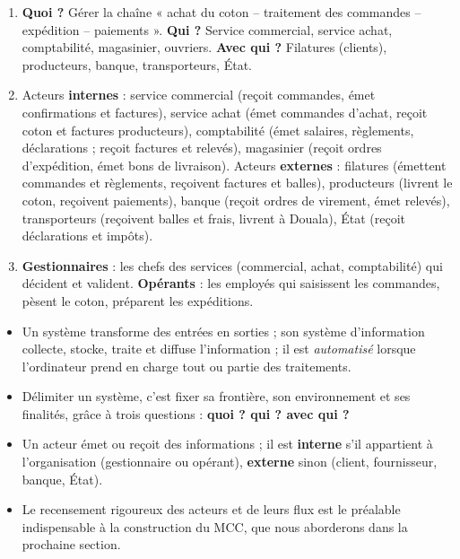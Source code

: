 \documentclass[11pt]{article}
\newcommand{\cle}[1]{{\popxbold\color{popdark}#1}}
\begin{document}
\begin{corrige}
\begin{enumerate}
  \item \textbf{Quoi ?} Gérer la chaîne « achat du coton -- traitement des commandes -- expédition -- paiements ». \textbf{Qui ?} Service commercial, service achat, comptabilité, magasinier, ouvriers. \textbf{Avec qui ?} Filatures (clients), producteurs, banque, transporteurs, État.
  \item Acteurs \textbf{internes} : service commercial (reçoit commandes, émet confirmations et factures), service achat (émet commandes d'achat, reçoit coton et factures producteurs), comptabilité (émet salaires, règlements, déclarations ; reçoit factures et relevés), magasinier (reçoit ordres d'expédition, émet bons de livraison). Acteurs \textbf{externes} : filatures (émettent commandes et règlements, reçoivent factures et balles), producteurs (livrent le coton, reçoivent paiements), banque (reçoit ordres de virement, émet relevés), transporteurs (reçoivent balles et frais, livrent à Douala), État (reçoit déclarations et impôts).
  \item \textbf{Gestionnaires} : les chefs des services (commercial, achat, comptabilité) qui décident et valident. \textbf{Opérants} : les employés qui saisissent les commandes, pèsent le coton, préparent les expéditions.
\end{enumerate}
\end{corrige}

\begin{aretenir}
\begin{itemize}
  \item Un \cle{système} transforme des entrées en sorties ; son \cle{système d'information} collecte, stocke, traite et diffuse l'information ; il est \emph{automatisé} lorsque l'ordinateur prend en charge tout ou partie des traitements.
  \item Délimiter un système, c'est fixer sa \cle{frontière}, son \cle{environnement} et ses \cle{finalités}, grâce à trois questions : \textbf{quoi ? qui ? avec qui ?}
  \item Un \cle{acteur} émet ou reçoit des informations ; il est \textbf{interne} s'il appartient à l'organisation (gestionnaire ou opérant), \textbf{externe} sinon (client, fournisseur, banque, État).
  \item Le recensement rigoureux des acteurs et de leurs flux est le préalable indispensable à la construction du MCC, que nous aborderons dans la prochaine section.
\end{itemize}
\end{aretenir}
\end{document}

